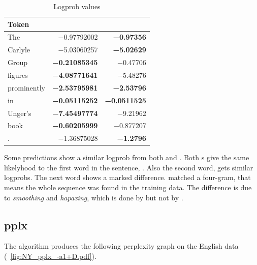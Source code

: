\documentclass[a4paper,10pt,twoside]{report}
\begin{document}
\begin{table}[h!]
\caption{Logprob values}
\centering
\vspace{\baselineskip}
\begin{tabular}{ l r r }
\toprule
Token & \wopr{} & \srilm{} \\ [.5ex]
\midrule
The         &     \num{-0.97792002}  & \bf{\num{-0.97356}\phantom{00}} \\
Carlyle     &     \num{-5.03060257}  & \bf{\num{-5.02629}\phantom{00}} \\
Group       & \bf{\num{-0.21085345}} &     \num{-0.47706}\phantom{00} \\
figures     & \bf{\num{-4.08771641}} &     \num{-5.48276}\phantom{00} \\
prominently & \bf{\num{-2.53795981}} & \bf{\num{-2.53796}\phantom{00}} \\
in          & \bf{\num{-0.05115252}} & \bf{\num{-0.0511525}} \\
Unger's     & \bf{\num{-7.45497774}} &     \num{-9.21962}\phantom{00}  \\
book        & \bf{\num{-0.60205999}} &     \num{-0.877207}\phantom{0} \\
.           &     \num{-1.36875028}  & \bf{\num{-1.2796}\phantom{000}} \\
\bottomrule
\end{tabular}
\label{tab:logprob}
\end{table}

Some predictions show a similar logprob from both \wopr{} and
\srilm{}. Both \lm{}s give the same likelyhood to the first word in
the sentence, . Also the second word,  gets
similar logprobs. The next word shows a marked difference. \Srilm{}
matched a four-gram, that means the whole sequence  was found in the training data. The difference is due
to \emph{smoothing} and \emph{hapaxing}, which is done by \srilm{} but
not by \wopr{}.

\subsection{pplx}

The \igtree{} algorithm produces the following perplexity graph on the
English data (\figurename~\ref{fig:NY_pplx_-a1+D.pdf}).
\end{document}
